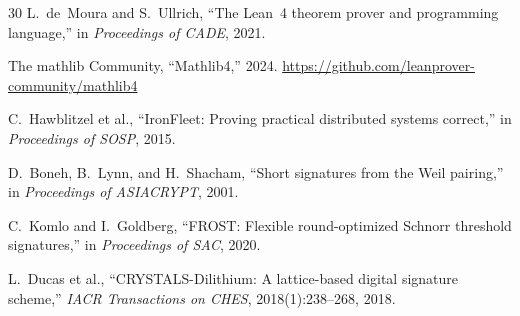 \documentclass[11pt,a4paper]{article}
\begin{document}
\begin{thebibliography}{30}
L.~de~Moura and S.~Ullrich, ``The Lean~4 theorem prover and programming language,''
in \textit{Proceedings of CADE}, 2021.

The mathlib Community, ``Mathlib4,'' 2024.
\url{https://github.com/leanprover-community/mathlib4}

C.~Hawblitzel et al., ``IronFleet: Proving practical distributed systems correct,''
in \textit{Proceedings of SOSP}, 2015.

D.~Boneh, B.~Lynn, and H.~Shacham, ``Short signatures from the Weil pairing,''
in \textit{Proceedings of ASIACRYPT}, 2001.

C.~Komlo and I.~Goldberg, ``FROST: Flexible round-optimized Schnorr threshold
signatures,'' in \textit{Proceedings of SAC}, 2020.

L.~Ducas et al., ``CRYSTALS-Dilithium: A lattice-based digital signature scheme,''
\textit{IACR Transactions on CHES}, 2018(1):238--268, 2018.

\end{thebibliography}
\end{document}
